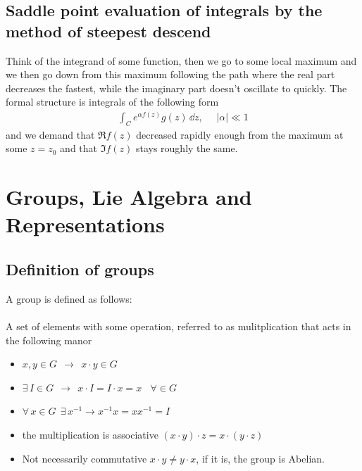 \documentclass[a4paper,12pt]{article}
\begin{document}
\subsection{Saddle point evaluation of integrals by the method of steepest descend}
Think of the integrand of some function, then we go to some local maximum and we then go down from this maximum following the path where the real part decreases the fastest, while the imaginary part doesn't oscillate to quickly. The formal structure is integrals of the following form
\begin{equation}
	\begin{aligned}
		\int_C e^{\alpha f(z)}g(z)\,\dd z,~~~~~~|\alpha|\ll 1
	\end{aligned}
\end{equation}
and we demand that $\Re f(z)$ decreased rapidly enough from the maximum at some $z=z_0$ and that $\Im f(z)$ stays roughly the same.
\section{Groups, Lie Algebra and Representations}
\subsection{Definition of groups}
A group is defined as follows:\\\\
A set of elements with some operation, referred to as mulitplication that acts in the following manor
\begin{itemize}
\item $x,y\in G~~ \to~~x\cdot y \in G$ 
\item $\exists\, I\in G~~ \to~~x\cdot I=I\cdot x =x~~~~\forall\in G$ 
\item $\forall\, x\in G~~\exists\,x^{-1}\to x^{-1} x=x x^{-1}=I$
\item the multiplication is associative $(x\cdot y)\cdot z=x\cdot (y\cdot z)$
\item Not necessarily commutative $x\cdot y\neq y\cdot x$, if it is, the group is Abelian.
\end{itemize}
\end{document}
